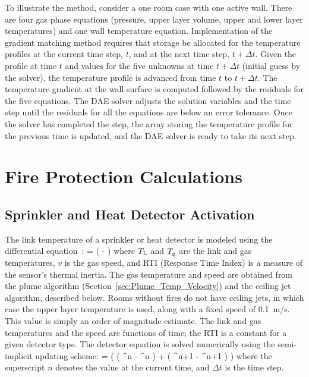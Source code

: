\documentclass[12pt,twoside]{book}
\begin{document}
To illustrate the method, consider a one room case with one active wall.  There are four gas phase equations (pressure, upper layer volume, upper and lower layer temperatures) and one wall temperature equation.  Implementation of the gradient matching method requires that storage be allocated for the temperature profiles at the current time step, $t$, and at the next time step, $t + \Delta t$.  Given the profile at time $t$ and values for the five unknowns at time $t + \Delta t$ (initial guess by the solver), the temperature profile is advanced from time $t$ to $t + \Delta t$.  The temperature gradient at the wall surface is computed followed by the residuals for the five equations.  The DAE solver adjusts the solution variables and the time step until the residuals for all the equations are below an error tolerance.  Once the solver has completed the step, the array storing the temperature profile for the previous time is updated, and the DAE solver is ready to take its next step.



\chapter{Fire Protection Calculations}



\section{Sprinkler and Heat Detector Activation}

The link temperature of a sprinkler or heat detector is modeled using the differential equation~\cite{Schifiliti:2002}:
\be
    =  \left( \Tg - \TL \right)  \label{eq:RTI}
\ee
where $T\sb{\mathrm{L}}$ and $T\sb{\mathrm{g}}$ are the link and gas temperatures, $v$ is the gas speed, and RTI (Response Time Index) is a measure of the sensor's thermal inertia. The gas temperature and speed are obtained from the plume algorithm (Section~\ref{sec:Plume_Temp_Velocity}) and the ceiling jet algorithm, described below. Rooms without fires do not have ceiling jets, in which case the upper layer temperature is used, along with a fixed speed of 0.1~m/s. This value is simply an order of magnitude estimate. The link and gas temperatures and the speed are functions of time; the RTI is a constant for a given detector type. The detector equation is solved numerically using the semi-implicit updating scheme:
\be
    =  \left(  \left( \Tg^n - \TL^n \right)  +  \left( \Tg^{n+1} - \TL^{n+1} \right)  \right) \label{eq:RTI_rewritten}
\ee
where the superscript $n$ denotes the value at the current time, and $\Delta t$ is the time step.
\end{document}
